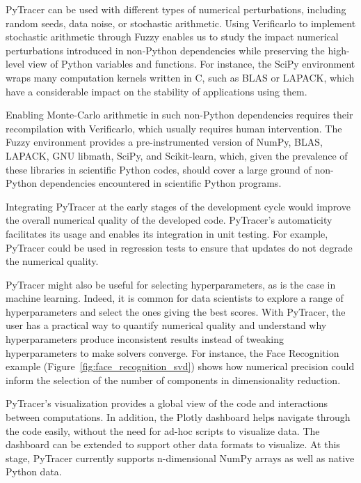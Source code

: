 \documentclass[10pt,journal,compsoc]{IEEEtran}
\newcommand{\pytracer}[0]{PyTracer\xspace}
\DeclareRobustCommand{\add}[1]{\textcolor{ao(english)}{#1}}%
\DeclareRobustCommand{\remove}[1]{}
\DeclareRobustCommand{\add}[1]{#1}
\DeclareRobustCommand{\remove}[1]{}
\begin{document}
\pytracer can be used with different types of numerical perturbations,
including random seeds, data noise, or stochastic arithmetic. Using 
Verificarlo to implement stochastic arithmetic through Fuzzy
enables \add{us} to study the impact \remove{of} numerical perturbations
introduced in non-Python dependencies while preserving the high-level view
of Python variables and functions. For instance, the SciPy environment
wraps many computation kernels written in C, such as BLAS or LAPACK, which
have a considerable impact on the stability of applications using them.

Enabling Monte-Carlo arithmetic in such non-Python dependencies requires
their recompilation with Verificarlo, which usually requires human
intervention. The Fuzzy environment provides a pre-instrumented version of
NumPy, BLAS, LAPACK, GNU libmath, SciPy, and Scikit-learn, which, given the
prevalence of these libraries in scientific Python codes, should cover a
large ground of non-Python dependencies encountered in scientific Python programs.


Integrating \pytracer at the early stages of the development cycle would improve
the overall numerical quality of the developed code. \pytracer's automaticity
facilitates its usage and enables its integration in unit testing. For example,
\pytracer could be used in regression tests to ensure that updates do not
degrade the numerical quality. 

\pytracer might also be useful for selecting hyperparameters, as is the case in
machine learning. Indeed, it is common for data scientists to explore a range of
hyperparameters and select the ones giving the best scores. With \pytracer, the
user has a practical way to quantify numerical quality and understand why
hyperparameters produce inconsistent results instead of tweaking hyperparameters
to make solvers converge. For instance, the Face Recognition example
(Figure~\ref{fig:face_recognition_svd}) shows how numerical precision could
inform the selection of the number of components in dimensionality reduction. 


\pytracer's visualization provides a global view of the code and interactions between
computations. In addition, the Plotly dashboard helps navigate through the code
easily, without the need for ad-hoc scripts to visualize data. The
dashboard can be extended to support other data formats to visualize. At this
stage, \pytracer currently supports n-dimensional NumPy arrays as well as native
Python data. 
\end{document}

